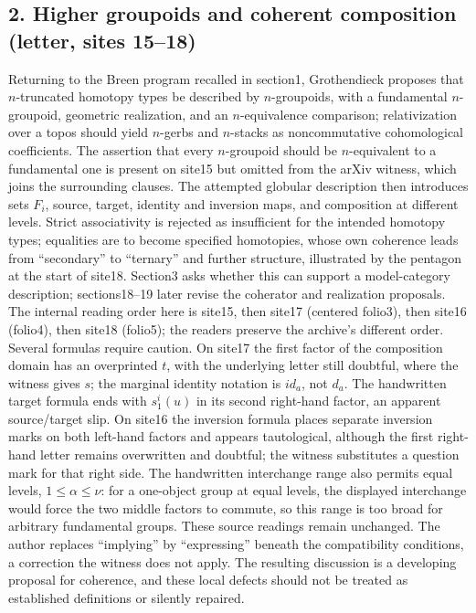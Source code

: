 \documentclass[10pt,oneside]{book}
\begin{document}
\subsection*{2. Higher groupoids and coherent composition (letter, sites 15--18)}
Returning to the Breen program recalled in section1, Grothendieck proposes that $n$-truncated homotopy types be described by $n$-groupoids, with a fundamental $n$-groupoid, geometric realization, and an $n$-equivalence comparison; relativization over a topos should yield $n$-gerbs and $n$-stacks as noncommutative cohomological coefficients. The assertion that every $n$-groupoid should be $n$-equivalent to a fundamental one is present on site15 but omitted from the arXiv witness, which joins the surrounding clauses. The attempted globular description then introduces sets $F_i$, source, target, identity and inversion maps, and composition at different levels. Strict associativity is rejected as insufficient for the intended homotopy types; equalities are to become specified homotopies, whose own coherence leads from ``secondary'' to ``ternary'' and further structure, illustrated by the pentagon at the start of site18. Section3 asks whether this can support a model-category description; sections18--19 later revise the coherator and realization proposals. The internal reading order here is site15, then site17 (centered folio3), then site16 (folio4), then site18 (folio5); the readers preserve the archive's different order. Several formulas require caution. On site17 the first factor of the composition domain has an overprinted $t$, with the underlying letter still doubtful, where the witness gives $s$; the marginal identity notation is $id_a$, not $d_a$. The handwritten target formula ends with $s^i_1(u)$ in its second right-hand factor, an apparent source/target slip. On site16 the inversion formula places separate inversion marks on both left-hand factors and appears tautological, although the first right-hand letter remains overwritten and doubtful; the witness substitutes a question mark for that right side. The handwritten interchange range also permits equal levels, $1\leq\alpha\leq\nu$: for a one-object group at equal levels, the displayed interchange would force the two middle factors to commute, so this range is too broad for arbitrary fundamental groups. These source readings remain unchanged. The author replaces ``implying'' by ``expressing'' beneath the compatibility conditions, a correction the witness does not apply. The resulting discussion is a developing proposal for coherence, and these local defects should not be treated as established definitions or silently repaired.
\end{document}
